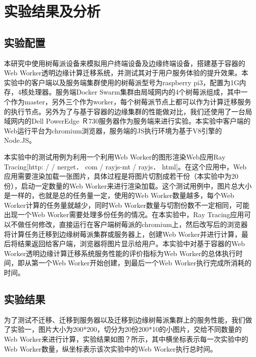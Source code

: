 \section{实验结果及分析}

\subsection{实验配置}

本研究中使用树莓派设备来模拟用户终端设备及边缘终端设备，搭建基于容器的Web Worker透明边缘计算迁移系统，并测试其对于用户服务体验的提升效果。本实验中的客户端以及服务端集群使用的树莓派型号为raspberry pi3，配置为1G内存，4核处理器。服务端Docker Swarm集群由局域网内的4个树莓派组成，其中一个作为master，另外三个作为worker，每个树莓派节点上都可以作为计算迁移服务的执行节点。另外为了与基于容器的边缘集群的性能做对比，我们还使用了一台局域网内的Dell PowerEdge Ｒ730服务器作为服务端来进行实验。本实验中客户端的Web运行平台为chromium浏览器，服务端的JS执行环境为基于V8引擎的Node.JS。

本实验中的测试用例为利用一个利用Web Worker的图形渲染Web应用Ray Tracing[http: / / nerget． com / rayjs-mt / rayjs． html]。在这个应用中，Web应用需要渲染加载一张图片，具体过程是将图片切割成若干份（本实验中为20份），启动一定数量的Web Worker来进行渲染加载。这个测试用例中，图片总大小是一样的，也就是总的任务量一定，使用的Web Worker数量越多，每个Web Worker计算的任务量就越少，同时Web Worker数量与切割份数不一定相同，可能出现一个Web Worker需要处理多份任务的情况。在本实验中，Ray Tracing应用可以不做任何修改，直接运行在客户端树莓派的chromium上，然后改写后的浏览器将计算任务迁移到边缘树莓派集群或服务器上，创建Web Worker并进行计算，最后将结果返回给客户端，浏览器将图片显示给用户。本实验中对基于容器的Web Worker透明边缘计算迁移系统服务性能的评价指标为Web Worker的总体执行时间，即从第一个Web Worker开始创建，到最后一个Web Worker执行完成所消耗的时间。

\subsection{实验结果}

为了测试不迁移、迁移到服务器以及迁移到边缘树莓派集群上的服务性能，我们做了实验一，图片大小为200*200，切分为20份200*10的小图片，交给不同数量的Web Worker来进行计算，实验结果如图？所示，其中横坐标表示每一次实验中的Web Worker数量，纵坐标表示该次实验中的Web Worker执行总时间。

